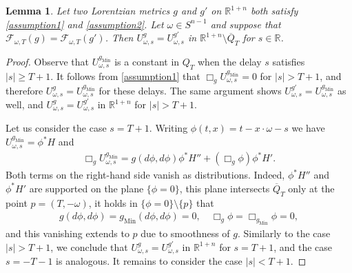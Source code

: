 \documentclass[11pt,letterpaper]{amsart}
\newtheorem{Lemma}[Theorem]{Lemma}
\theoremstyle{definition}
\numberwithin{equation}{section}
\newcommand{\ol}[1]{\overline{#1}}
\newcommand{\gm}{g_{\mathrm{Min}}}
\def\R{\mathbb R}
\begin{document}
\begin{Lemma}\label{lem_from_F_to_U}
Let two Lorentzian metrics $g$ and $g'$ on $\R^{1+n}$ both satisfy \eqref{assumption1} and \eqref{assumption2}. Let $\omega \in S^{n-1}$ and suppose that 
$\mathcal{F}_{\omega,T}(g) = \mathcal{F}_{\omega,T}(g')$.
Then $U_{\omega, s}^{g} = U_{\omega, s}^{g'}$ in $\R^{1+n} \setminus \ol{Q}_T$ for $s \in \R$.
\end{Lemma}
\begin{proof}
Observe that $U_{\omega, s}^{\gm}$ is a constant in $Q_T$ when the delay $s$ satisfies $|s| \ge T + 1$. It follows from \eqref{assumption1} that $\Box_g U_{\omega, s}^{\gm} = 0$ for $|s| > T + 1$, and therefore $U_{\omega, s}^{g} = U_{\omega, s}^{\gm}$ for these delays. The same argument shows $U_{\omega, s}^{g'} = U_{\omega, s}^{\gm}$ as well, and $U_{\omega, s}^{g} = U_{\omega, s}^{g'}$ in $\R^{1+n}$ for $|s| > T + 1$. 

Let us consider the case $s = T + 1$. Writing $\phi(t,x) = t - x \cdot \omega - s$ we have $U_{\omega, s}^{\gm} = \phi^* H$ and 
    \begin{align*}
\Box_g U_{\omega, s}^{\gm} 
= 
g(d\phi, d\phi) \phi^* H'' + (\Box_g \phi) \phi^* H'.
    \end{align*}
Both terms on the right-hand side vanish as distributions. Indeed, $\phi^* H''$ and $\phi^* H'$ are supported on the plane $\{\phi = 0\}$, this plane intersects $\overline{Q}_T$ only at the point $p = (T,-\omega)$, it holds in $\{\phi = 0\} \setminus \{p\}$ that
    \begin{align*}
g(d\phi, d\phi) = \gm(d\phi, d\phi) = 0,
\quad
\Box_g \phi = \Box_{\gm} \phi = 0,
    \end{align*}
and this vanishing extends to $p$ due to smoothness of $g$.
Similarly to the case $|s| > T + 1$, we conclude that $U_{\omega, s}^{g} = U_{\omega, s}^{g'}$ in $\R^{1+n}$ for $s = T + 1$, and the case $s = -T - 1$ is analogous.
It remains to consider the case $|s| < T + 1$.


\end{proof}
\end{document}
